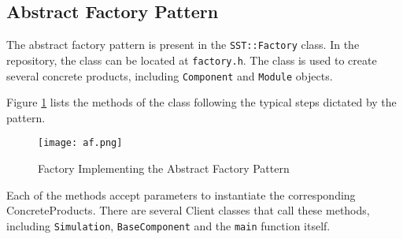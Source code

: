\subsection{Abstract Factory Pattern}
The abstract factory pattern is present in the \texttt{SST::Factory} class. In the repository, the class can be located at \texttt{factory.h}. The class is used to create several concrete products, including \texttt{Component} and \texttt{Module} objects.

Figure \ref{fig:af} lists the methods of the class following the typical steps dictated by the pattern.

\begin{figure}[h]
    \caption{Factory Implementing the Abstract Factory Pattern}
    \label{fig:af}
    \centering
    \texttt{[image: af.png]}
\end{figure}

Each of the methods accept parameters to instantiate the corresponding ConcreteProducts. There are several Client classes that call these methods, including \texttt{Simulation}, \texttt{BaseComponent} and the \texttt{main} function itself.

